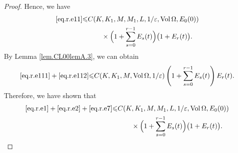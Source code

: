\documentclass[12pt,reqno]{amsart}
\numberwithin{equation}{section}
\theoremstyle{definition}
\theoremstyle{remark}
\begin{document}
\begin{proof}
Hence, we have
\begin{align}
  \eqref{eq.r.e11}{\leqslant}& C(K,K_1,M,M_1,L,1/{\varepsilon},{\mathrm{Vol}\,}\Omega,E_0(0)){\nonumber}\\
   &\qquad\times\Big(1+\sum_{s=0}^{r-1}E_s(t)\Big)\big(1+E_r(t)\big).
\end{align}
By Lemma \ref{lem.CL00lemA.3}, we can obtain
\begin{align}
  \eqref{eq.r.e111}+ \eqref{eq.r.e112}{\leqslant} C(K,K_1,M,{\mathrm{Vol}\,}\Omega,1/{\varepsilon})\left(1+\sum_{s=0}^{r-1} E_s(t)\right)E_r(t).
\end{align}
Therefore, we have shown that
\begin{align}
  \eqref{eq.r.e1}+\eqref{eq.r.e2}+\eqref{eq.r.e7}{\leqslant} &C(K,K_1,M,M_1,L,1/{\varepsilon},{\mathrm{Vol}\,}\Omega,E_0(0)){\nonumber}\\
   &\qquad\times\Big(1+\sum_{s=0}^{r-1}E_s(t)\Big)\big(1+E_r(t)\big).
\end{align}


\end{proof}
\end{document}
